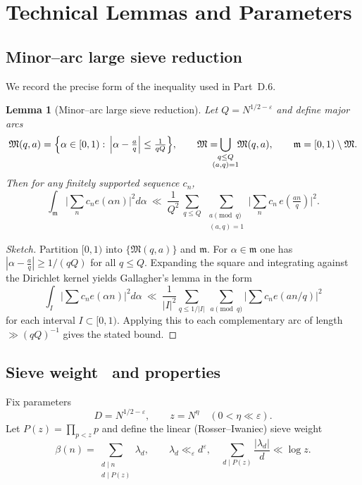 \documentclass[11pt]{article}
\renewcommand{\thepart}{\Alph{part}}
\newtheorem{lemma}{Lemma}[part]
\theoremstyle{definition}
\theoremstyle{remark}
\numberwithin{equation}{part}
\renewcommand{\thesection}{\thepart.\arabic{section}}
\begin{document}
\appendix
\renewcommand{\thesection}{Appendix~\Roman{section}}
\section{Technical Lemmas and Parameters}

\subsection{Minor--arc large sieve reduction}

We record the precise form of the inequality used in Part~D.6.

\begin{lemma}[Minor--arc large sieve reduction]\label{lem:largesieve-minor}
	Let $Q=N^{1/2-\varepsilon}$ and define major arcs
	\[
		\mathfrak M(q,a)=\Bigl\{\alpha\in[0,1):\,\Big|\alpha-\tfrac{a}{q}\Big|\le \tfrac{1}{qQ}\Bigr\},
		\qquad \mathfrak M=\!\!\!\!\!\bigcup_{\substack{q\le Q\\ (a,q)=1}}\!\!\mathfrak M(q,a),
		\qquad \mathfrak m=[0,1)\setminus\mathfrak M.
	\]
	Then for any finitely supported sequence $c_n$,
	\[
		\int_{\mathfrak m}\Big|\sum_{n}c_n e(\alpha n)\Big|^2 d\alpha
		\ \ll\ \frac{1}{Q^2}\,
		\sum_{q\le Q}\ \sum_{\substack{a\!\!\!\pmod q\\ (a,q)=1}}
		\Big|\sum_{n} c_n\,e\!\left(\tfrac{an}{q}\right)\Big|^2.
	\]
\end{lemma}

\begin{proof}[Sketch]
	Partition $[0,1)$ into $\{\mathfrak M(q,a)\}$ and $\mathfrak m$. For $\alpha\in\mathfrak m$ one has
	$|\alpha-\tfrac aq|\ge 1/(qQ)$ for all $q\le Q$. Expanding the square and integrating against the Dirichlet kernel yields Gallagher’s lemma in the form
	\[
		\int_{I} \Big|\sum c_n e(\alpha n)\Big|^2 d\alpha
		\ \ll\ \frac{1}{|I|^2}\sum_{q\le 1/|I|}\ \sum_{a\pmod q}\Big|\sum c_n e(an/q)\Big|^2
	\]
	for each interval $I\subset[0,1)$. Applying this to each complementary arc of length $\gg (qQ)^{-1}$ gives the stated bound.
\end{proof}

\subsection{Sieve weight \textbeta\ and properties}

Fix parameters
\[
	D=N^{1/2-\varepsilon},\qquad z=N^{\eta}\quad(0<\eta\ll \varepsilon).
\]
Let $P(z)=\prod_{p<z}p$ and define the linear (Rosser--Iwaniec) sieve weight
\[
	\beta(n)=\sum_{\substack{d\mid n\\ d\mid P(z)}} \lambda_d,\qquad
	\lambda_d\ll_\varepsilon d^{\varepsilon},\quad
	\sum_{d\mid P(z)}\frac{|\lambda_d|}{d}\ll \log z.
\]
\end{document}
